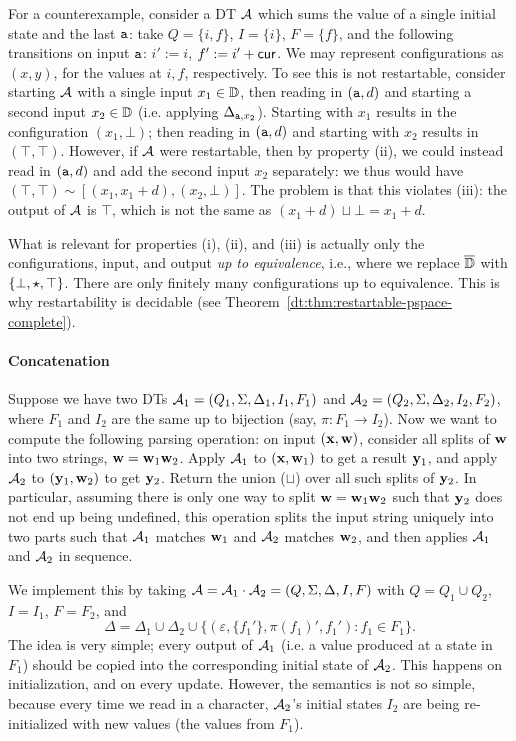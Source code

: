 For a counterexample, consider a DT $\mathcal{A}$ which sums the value of a single initial state and the last ${\texttt{a}}$: take $Q = \{i, f\}$, $I = \{i\}$, $F = \{f\}$, and the following transitions on input ${\texttt{a}}$: $i' := i$, $f' := i' + \mathsf{cur}$. We may represent configurations as $(x,y)$, for the values at $i, f$, respectively. To see this is not restartable, consider starting $\mathcal{A}$ with a single input $x_1 \in \mathbb{D}$, then reading in $({\texttt{a}},d)$ and starting a second input $x_2 \in \mathbb{D}$ (i.e. applying $\Delta_{{\texttt{a}},x_2}$). Starting with $x_1$ results in the configuration $(x_1,\bot)$; then reading in $({\texttt{a}},d)$ and starting with $x_2$ results in $(\top, \top)$. However, if $\mathcal{A}$ were restartable, then by property (ii), we could instead read in $({\texttt{a}},d)$ and add the second input $x_2$ separately: we thus would have $(\top,\top) \sim [(x_1,x_1+d),(x_2,\bot)]$. The problem is that this violates (iii): the output of $\mathcal{A}$ is $\top$, which is not the same as $(x_1 + d) \sqcup \bot = x_1 + d$.

What is relevant for properties (i), (ii), and (iii) is actually only the configurations, input, and output \emph{up to equivalence}, i.e., where we replace $\overline{\mathbb{D}{}}$ with $\{\bot, \star, \top\}$.
There are only finitely many configurations up to equivalence. This is why restartability is decidable (see Theorem~\ref{dt:thm:restartable-pspace-complete}).

\paragraph*{Concatenation}
Suppose we have two DTs $\mathcal{A}_1 = (Q_{1}, \Sigma, \Delta_{1}, I_{1}, F_{1})$ and $\mathcal{A}_2 = (Q_{2}, \Sigma, \Delta_{2}, I_{2}, F_{2})$, where $F_1$ and $I_2$ are the same up to bijection (say, $\pi: F_1 \to I_2$).
Now we want to compute the following parsing operation: on input $(\mathbf{x},\mathbf{w})$, consider all splits of $\mathbf{w}$ into two strings, $\mathbf{w} = \mathbf{w}_1 \mathbf{w}_2$. Apply $\mathcal{A}_1$ to $(\mathbf{x},\mathbf{w}_1)$ to get a result $\mathbf{y}_1$, and apply $\mathcal{A}_2$ to $(\mathbf{y}_1,\mathbf{w}_2)$ to get $\mathbf{y}_2$. Return the union ($\sqcup$) over all such splits of $\mathbf{y}_2$. In particular, assuming there is only one way to split $\mathbf{w} = \mathbf{w}_1 \mathbf{w}_2$ such that $\mathbf{y}_2$ does not end up being undefined, this operation splits the input string uniquely into two parts such that $\mathcal{A}_1$ matches $\mathbf{w}_1$ and $\mathcal{A}_2$ matches $\mathbf{w}_2$, and then applies $\mathcal{A}_1$ and $\mathcal{A}_2$ in sequence.

We implement this by taking $\mathcal{A} = \mathcal{A}_1 \cdot \mathcal{A}_2 = (Q, \Sigma, \Delta, I, F){}$ with $Q = Q_1 \cup Q_2$, $I = I_1$, $F = F_2$, and
\[
\Delta = \Delta_1 \cup \Delta_2 \cup \big\{(\varepsilon, \{f_1'\}, \pi(f_1)', f_1'): f_1 \in F_1 \big\}.
\]
The idea is very simple; every output of $\mathcal{A}_1$ (i.e. a value produced at a state in $F_1$) should be copied into the corresponding initial state of $\mathcal{A}_2$. This happens on initialization, and on every update. However, the semantics is not so simple, because every time we read in a character, $\mathcal{A}_2$'s initial states $I_2$ are being re-initialized with new values (the values from $F_1$).

